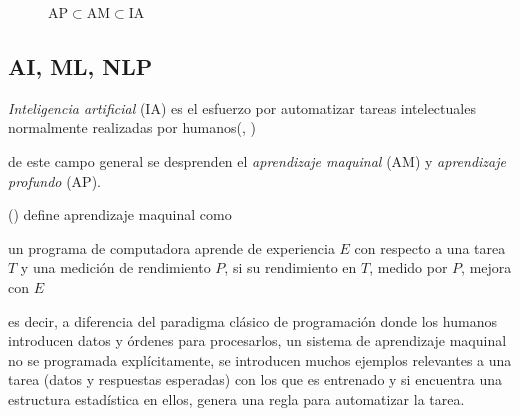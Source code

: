 \begin{wrapfigure}{r}{4.4cm}
	\caption[Inteligencia Artificial]{AP$\subset$AM$\subset$IA}
\end{wrapfigure}\label{fig:AI}\subsection {AI, ML, NLP}\label{subsec:intela}
\begin{displayquote}
\emph{Inteligencia artificial} (IA) es el esfuerzo por automatizar tareas intelectuales normalmente realizadas por humanos(\citeauthor{cho18}, \citeyear{cho18})
\end{displayquote}
de este campo general se desprenden el \emph{aprendizaje maquinal} (AM) y \emph{aprendizaje profundo} (AP).

\citeauthor{mich19} (\citeyear{mich19}) define aprendizaje maquinal como\begin{displayquote}
un programa de computadora aprende de experiencia $E$ con respecto a una tarea $T$ y una medición de rendimiento $P$, si su rendimiento en $T$, medido por $P$, mejora con $E$
\end{displayquote}
es decir, a diferencia del paradigma clásico de programación donde los humanos introducen datos y órdenes para procesarlos, un sistema de aprendizaje maquinal no se programada explícitamente, se introducen muchos ejemplos relevantes a una tarea (datos y respuestas esperadas) con los que es entrenado y si encuentra una estructura estadística en ellos, genera una regla para automatizar la tarea.

